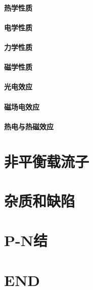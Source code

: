 \documentclass[UTF8]{../06-Physics}
\begin{document}
    \subsubsection{热学性质}
    \subsubsection{电学性质}
    \subsubsection{力学性质}
    \subsubsection{磁学性质}

    \subsubsection{光电效应}
    \subsubsection{磁场电效应}
    \subsubsection{热电与热磁效应}




\chapter{非平衡载流子}


\chapter{杂质和缺陷}


\chapter{P-N结}


\chapter{END}
\end{document}

